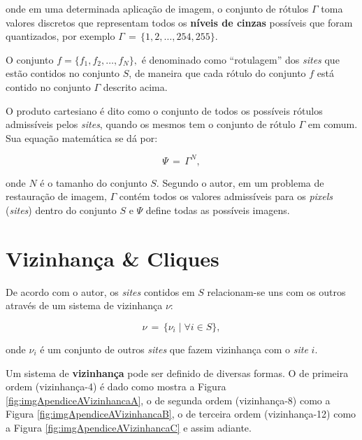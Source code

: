 \noindent onde em uma determinada aplicação de imagem, o conjunto de rótulos $\varGamma$ toma valores discretos que representam todos os \textbf{níveis de cinzas} possíveis que foram quantizados, por exemplo $\varGamma \, = \, \{1,2,\dots,254,255\}$.

O conjunto $f = \{f_{1},f_{2},\dots,f_{N}\},$ é denominado como ``rotulagem'' dos \textit{sites} que estão contidos no conjunto $S$, de maneira que cada rótulo do conjunto $f$ está contido no conjunto $\varGamma$ descrito acima.

O produto cartesiano é dito como o conjunto de todos os possíveis rótulos admissíveis pelos \textit{sites}, quando os mesmos tem o conjunto de rótulo $\varGamma$ em comum. Sua equação matemática se dá por:

\begin{equation}
	\varPsi \, = \, \varGamma^{N},
	\label{eq:eqApendiceAProdutoCarteziano}
\end{equation}   

\noindent onde $N$ é o tamanho do conjunto $S$. Segundo o autor, em um problema de restauração de imagem, $\varGamma$ contém todos os valores admissíveis para os \textit{pixels} (\textit{sites}) dentro do conjunto $S$ e $\varPsi$ define todas as possíveis imagens.  



\section{Vizinhança \& Cliques}\label{ApendiceA:sVizinhancaCliques}

De acordo com o autor, os \textit{sites} contidos em $S$ relacionam-se uns com os outros através de um sistema de vizinhança $\nu$:

\begin{equation}
	\nu \, = \, \{\nu_{i} \mid \forall i \in S\},
	\label{eq:eqApendiceAVizinhanca}
\end{equation}  

\noindent onde $\nu_{i}$ é um conjunto de outros \textit{sites} que fazem vizinhança com o \textit{site} $i$.

Um sistema de \textbf{vizinhança} pode ser definido de diversas formas. O de primeira ordem (vizinhança-4) é dado como mostra a Figura \ref{fig:imgApendiceAVizinhancaA}, o de segunda ordem (vizinhança-8) como a Figura \ref{fig:imgApendiceAVizinhancaB}, o de terceira ordem (vizinhança-12) como a Figura \ref{fig:imgApendiceAVizinhancaC} e assim adiante.


